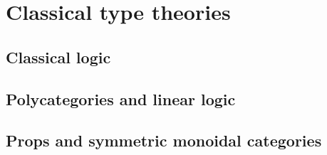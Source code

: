 \chapter{Classical type theories}
\label{chap:polycats}


\section{Classical logic}
\label{sec:classical}



\section{Polycategories and linear logic}
\label{sec:cllin}



\section{Props and symmetric monoidal categories}
\label{sec:prop-smc}


